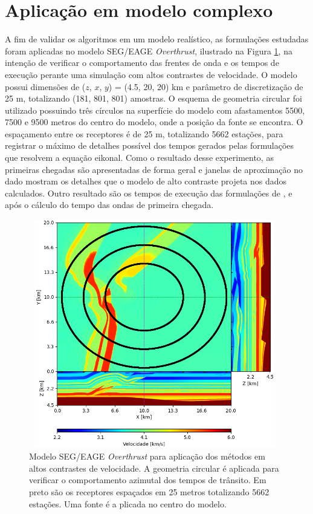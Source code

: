 \section{Aplicação em modelo complexo}

A fim de validar os algoritmos em um modelo realístico, as formulações estudadas foram aplicadas no modelo SEG/EAGE \textit{Overthrust}, ilustrado na Figura \ref{fig:overthrust}, na intenção de verificar o comportamento das frentes de onda e os tempos de execução perante uma simulação com altos contrastes de velocidade. O modelo possui dimensões de  ($z$, $x$, $y$) = (4.5, 20, 20) km e parâmetro de discretização de 25 m, totalizando (181, 801, 801) amostras. O esquema de geometria circular foi utilizado possuindo três círculos na superfície do modelo com afastamentos 5500, 7500 e 9500 metros do centro do modelo, onde a posição da fonte se encontra. O espaçamento entre os receptores é de 25 m, totalizando 5662 estações, para registrar o máximo de detalhes possível dos tempos gerados pelas formulações que resolvem a equação eikonal. Como o resultado desse experimento, as primeiras chegadas são apresentadas de forma geral e janelas de aproximação no dado mostram os detalhes que o modelo de alto contraste projeta nos dados calculados. Outro resultado são os tempos de execução das formulações de ,  e  após o cálculo do tempo das ondas de primeira chegada. 

\begin{figure}[H]
	\centering
	\includegraphics[width = 11cm, height = 9.99cm]{Imgs/Metodologia/overthrust.png}
	\caption{Modelo SEG/EAGE \textit{Overthrust} para aplicação dos métodos em altos contrastes de velocidade. A geometria circular é aplicada para verificar o comportamento azimutal dos tempos de trânsito. Em preto são os receptores espaçados em 25 metros totalizando 5662 estações. Uma fonte é a plicada no centro do modelo.}
	\label{fig:overthrust}
\end{figure}








